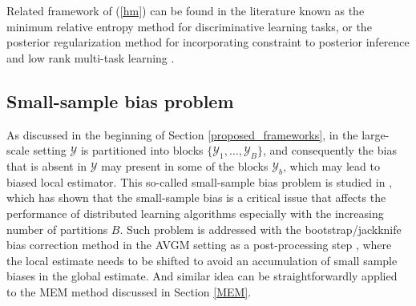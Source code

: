 \documentclass{article}
\newcommand{\1}[0]{\ensuremath{\boldsymbol{1}}\xspace}
\begin{document}
Related framework of (\ref{hm}) can be found in the literature known as the minimum relative entropy method \cite{Jaakkola1999, Zhu2012} for discriminative learning tasks, or the posterior regularization method \cite{Ganchev2010} for incorporating constraint to posterior inference and low rank multi-task learning \cite{Koyejo2013}.

\subsection{Small-sample bias problem}\label{pADMM}

As discussed in the beginning of Section \ref{proposed_frameworks}, in the large-scale setting $\mathcal{Y}$ is partitioned into blocks $\{\mathcal{Y}_1, \ldots, \mathcal{Y}_B\}$, and consequently the bias that is absent in $\mathcal{Y}$ may present in some of the blocks $\mathcal{Y}_b$, which may lead to biased local estimator. This so-called small-sample bias problem is studied in \cite{YZhang2012, Scott2013}, which has shown that the small-sample bias is a critical issue that affects the performance of distributed learning algorithms especially with the increasing number of partitions $B$. Such problem is addressed with the bootstrap/jackknife bias correction method in the AVGM setting as a post-processing step \cite{YZhang2012, Scott2013}, where the local estimate needs to be shifted to avoid an accumulation of small sample biases in the global estimate. And similar idea can be straightforwardly applied to the MEM method discussed in Section \ref{MEM}.
\end{document}
